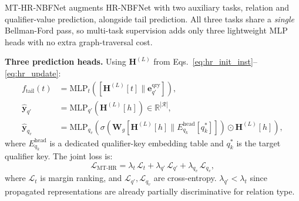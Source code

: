 \documentclass[10pt,journal,compsoc]{IEEEtran}
\begin{document}
MT-HR-NBFNet augments HR-NBFNet with two auxiliary
tasks, relation and qualifier-value prediction,
alongside tail prediction. All three tasks share a
\emph{single} Bellman-Ford pass, so multi-task
supervision adds only three lightweight MLP heads
with no extra graph-traversal cost.

\noindent\textbf{Three prediction heads.}
Using $\mathbf{H}^{(L)}$ from
Eqs.~\ref{eq:hr_init_inst}--\ref{eq:hr_update}:
\begin{align}
  f_{\mathrm{tail}}(t)
  &= \mathrm{MLP}_t\!\left(
      [\mathbf{H}^{(L)}[t]
      \| \mathbf{e}_{q'}^{\mathrm{qry}}]
    \right),
  \label{eq:mthr_tail} \\
  \hat{\mathbf{y}}_{q'}
  &= \mathrm{MLP}_{q'}\!\left(
      \mathbf{H}^{(L)}[h]
    \right)
  \in \mathbb{R}^{|\mathcal{R}|},
  \label{eq:mthr_rel} \\
  \hat{\mathbf{y}}_{q_v}
  &= \mathrm{MLP}_{q_v}\!\left(
      \sigma\!\left(
        \mathbf{W}_g [
          \mathbf{H}^{(L)}[h]
          \|
          E_{q_k}^{\mathrm{head}}[q_k^*]
        ]
      \right)
      \odot \mathbf{H}^{(L)}[h]
    \right),
  \label{eq:mthr_qv}
\end{align}
where $E_{q_k}^{\mathrm{head}}$ is a dedicated
qualifier-key embedding table and $q_k^*$ is the
target qualifier key. The joint loss is:
\begin{equation}
  \mathcal{L}_{\mathrm{MT\text{-}HR}}
  = \lambda_t\,\mathcal{L}_t
  + \lambda_{q'}\,\mathcal{L}_{q'}
  + \lambda_{q_v}\,\mathcal{L}_{q_v},
  \label{eq:mthr_loss}
\end{equation}
where $\mathcal{L}_t$ is margin ranking, and
$\mathcal{L}_{q'}, \mathcal{L}_{q_v}$ are
cross-entropy. $\lambda_{q'} < \lambda_t$ since
propagated representations are already partially
discriminative for relation type.
\end{document}
